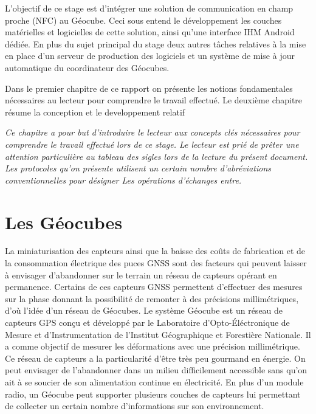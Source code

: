 \documentclass{themeensg}
\begin{document}
	L'objectif de ce stage est d'intégrer une solution de communication en champ proche (NFC) au Géocube. Ceci sous entend le développement les couches matérielles et logicielles de cette solution, ainsi qu'une interface IHM Android dédiée. En plus du sujet principal du stage deux autres tâches relatives à la mise en place d'un serveur de production des logiciels et un système de mise à jour automatique du coordinateur des Géocubes.
	
	Dans le premier chapitre de ce rapport on présente les notions fondamentales nécessaires au lecteur pour comprendre le travail effectué. Le deuxième chapitre résume la conception et le developpement relatif  



\textit{ Ce chapitre a pour but d'introduire le lecteur aux concepts clés nécessaires pour comprendre le travail effectué lors de ce stage.
Le lecteur est prié de prêter une attention particulière au tableau des sigles lors de la lecture du présent document. Les protocoles qu'on présente utilisent un certain nombre d’abréviations conventionnelles pour désigner Les opérations d'échanges entre. }

\section{Les Géocubes}
La miniaturisation des capteurs ainsi que la baisse des coûts de fabrication et de la consommation électrique des puces GNSS sont des facteurs qui peuvent laisser à envisager d'abandonner sur le terrain un réseau de capteurs opérant en permanence. Certains de ces capteurs GNSS permettent d'effectuer des mesures sur la phase donnant la possibilité de remonter à des précisions millimétriques, d'où l'idée d'un réseau de Géocubes. Le système Géocube est un réseau de capteurs GPS conçu et développé par le Laboratoire d'Opto-Éléctronique de Mesure et d'Instrumentation de l'Institut Géographique et Forestière Nationale. Il a comme objectif de mesurer les déformations avec une précision millimétrique. Ce réseau de capteurs a la particularité d'être très peu gourmand en énergie. On peut envisager de l'abandonner dans un milieu difficilement accessible sans qu'on ait à se soucier de son alimentation continue en électricité. En plus d'un module radio, un Géocube peut supporter plusieurs couches de capteurs lui permettant de collecter un certain nombre d'informations sur son environnement.
\end{document}
